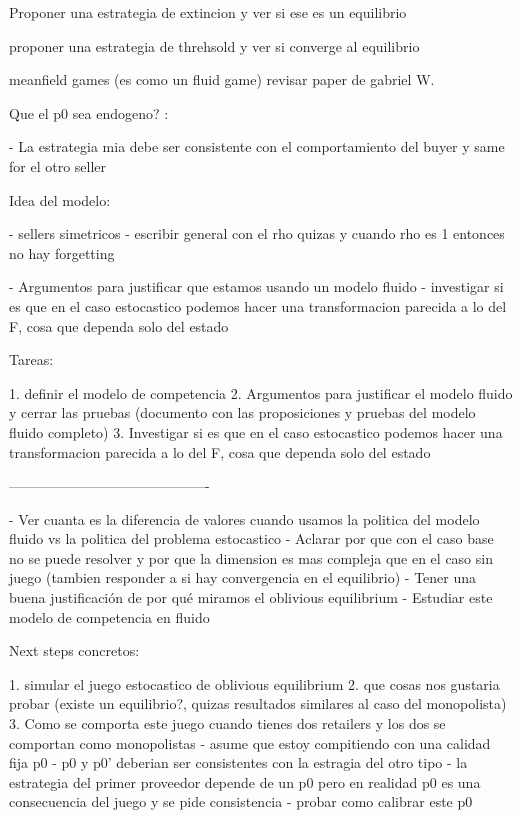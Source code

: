 Proponer una estrategia de extincion y ver si ese es un equilibrio

proponer una estrategia de threhsold y ver si converge al equilibrio 

meanfield games (es como un fluid game) revisar paper de gabriel W. 

Que el p0 sea endogeno? :

- La estrategia mia debe ser consistente con el comportamiento del buyer y same for el otro seller

Idea del modelo: 

- sellers simetricos 
- escribir general con el rho quizas y cuando rho es 1 entonces no hay forgetting 

- Argumentos para justificar que estamos usando un modelo fluido 
- investigar si es que en el caso estocastico podemos hacer una transformacion parecida a lo del F, cosa que dependa solo del estado 

Tareas:

1. definir el modelo de competencia
2. Argumentos para justificar el modelo fluido y cerrar las pruebas (documento con las proposiciones y pruebas del modelo fluido completo)
3. Investigar si es que en el caso estocastico podemos hacer una transformacion parecida a lo del F, cosa que dependa solo del estado 


-------------------------------------------

- Ver cuanta es la diferencia de valores cuando usamos la politica del modelo fluido vs la politica del problema estocastico
- Aclarar por que con el caso base no se puede resolver y por que la dimension es mas compleja que en el caso sin juego (tambien responder a si hay convergencia en el equilibrio)
- Tener una buena justificación de por qué miramos el oblivious equilibrium 
- Estudiar este modelo de competencia en fluido 

Next steps concretos: 

1. simular el juego estocastico de oblivious equilibrium
2. que cosas nos gustaria probar (existe un equilibrio?, quizas resultados similares al caso del monopolista)
3. Como se comporta este juego cuando tienes dos retailers y los dos se comportan como monopolistas 
    - asume que estoy compitiendo con una calidad fija p0 
    - p0 y p0' deberian ser consistentes con la estragia del otro tipo
    - la estrategia del primer proveedor depende de un p0 pero en realidad p0 es una consecuencia del juego y se pide consistencia 
    - probar como calibrar este p0 

